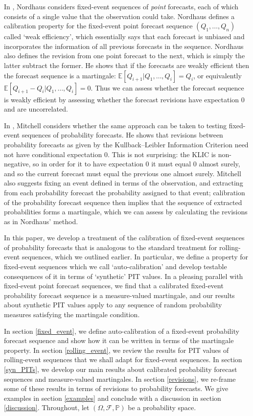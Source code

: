 \documentclass[aap]{imsart}
\theoremstyle{plain}
\theoremstyle{definition}
\begin{document}
In \cite{nrd87}, Nordhaus considers fixed-event sequences of \textit{point} forecasts, each of which consists of a single value that the observation could take. Nordhaus defines a calibration property for the fixed-event point forecast sequence $(Q_1, \ldots, Q_n)$ called `weak efficiency', which essentially says that each forecast is unbiased and incorporates the information of all previous forecasts in the sequence. Nordhaus also defines the revision from one point forecast to the next, which is simply the latter subtract the former. He shows that if the forecasts are weakly efficient then the forecast sequence is a martingale: $\mathbb{E}[Q_{i+1}|Q_1, \ldots, Q_i] = Q_i$, or equivalently $\mathbb{E}[Q_{i+1} - Q_i|Q_1, \ldots, Q_i] = 0$. Thus we can assess whether the forecast sequence is weakly efficient by assessing whether the forecast revisions have expectation $0$ and are uncorrelated.

In \cite{mtc08}, Mitchell considers whether the same approach can be taken to testing fixed-event sequences of probability forecasts. He shows that revisions between probability forecasts as given by the Kullback--Leibler Information Criterion need not have conditional expectation $0$. This is not surprising: the KLIC is non-negative, so in order for it to have expectation $0$ it must equal $0$ almost surely, and so the current forecast must equal the previous one almost surely. Mitchell also suggests fixing an event defined in terms of the observation, and extracting from each probability forecast the probability assigned to that event; calibration of the probability forecast sequence then implies that the sequence of extracted probabilities forms a martingale, which we can assess by calculating the revisions as in Nordhaus' method.

In this paper, we develop a treatment of the calibration of fixed-event sequences of probability forecasts that is analogous to the standard treatment for rolling-event sequences, which we outlined earlier. In particular, we define a property for fixed-event sequences which we call `auto-calibration' and develop testable consequences of it in terms of `synthetic' PIT values. In a pleasing parallel with fixed-event point forecast sequences, we find that a calibrated fixed-event probability forecast sequence is a measure-valued martingale, and our results about synthetic PIT values apply to any sequence of random probability measures satisfying the martingale condition.

In section \ref{fixed_event}, we define auto-calibration of a fixed-event probability forecast sequence and show how it can be written in terms of the martingale property. In section \ref{rolling_event}, we review the results for PIT values of rolling-event sequences that we shall adapt for fixed-event sequences. In section \ref{syn_PITs}, we develop our main results about calibrated probability forecast sequences and measure-valued martingales. In section \ref{revisions}, we re-frame some of these results in terms of revisions to probability forecasts. We give examples in section \ref{examples} and conclude with a discussion in section \ref{discussion}. Throughout, let $(\Omega, \mathcal{F}, \mathbb{P})$ be a probability space.
\end{document}
